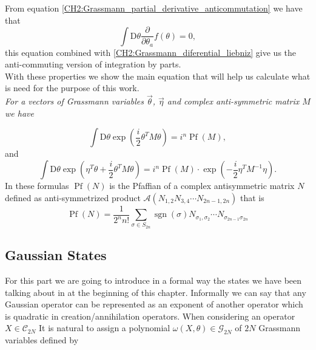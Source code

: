 \indent From equation \eqref{CH2:Grassmann_partial_derivative_anticommutation}  we have that
\begin{equation}
\int \mathrm{D} \theta \frac{\partial}{\partial \theta_{a}} f(\theta)=0,
\end{equation}
this equation combined with \eqref{CH2:Grassmann_diferential_liebniz} give us the anti-commuting version of integration by parts.\\

\indent With these properties we show the main equation that will help us calculate what is need for the purpose of this work.\\

\indent \textit{For a vectors of Grassmann variables  $\vec{\theta}$, $\vec{\eta}$ and complex anti-symmetric matrix $M$ we have}

\begin{equation}
\int \mathrm{D} \theta \exp \left(\frac{i}{2} \theta^{T} M \theta\right)=i^{n} \operatorname{Pf}(M),
\label{CH2:Grassman_property_1}
\end{equation}
and
\begin{equation}
\int \mathrm{D} \theta \exp \left(\eta^{T} \theta+\frac{i}{2} \theta^{T} M \theta\right)= i^{n} \operatorname{Pf}(M)  \cdot \exp \left(-\frac{i}{2} \eta^{T} M^{-1} \eta\right).
\label{CH2:Grassman_property_2}
\end{equation}
\indent In these formulas $\operatorname{Pf}(N)$ is the Pfaffian of a complex antisymmetric matrix $N$ defined as  anti-symmetrized product $\mathcal{A}(N_{1,2}N_{3,4}\cdots N_{2n-1,2n})$ that is
\begin{equation}
\operatorname{Pf}(N)=\frac{1}{2^{n} n !} \sum_{\sigma \in S_{2 n}} \operatorname{sgn}(\sigma) N_{\sigma_{1}, \sigma_{2}} \cdots N_{\sigma_{2 n-1} \sigma_{2 n}}
\label{CH2:Grassmann_Pfaffian}
\end{equation}
\subsection{Gaussian States}

For this part we are going to introduce in a formal way the states we have been talking about in at the beginning of this chapter. Informally we can say that any Gaussian operator can be represented as an exponent of another operator which is quadratic in creation/annihilation operators. When considering an operator $X\in\mathcal{C}_{2N}$ It is natural to assign a polynomial $\omega(X,\theta)\in \mathcal{G}_{2N}$ of $2N$ Grassmann variables defined by

